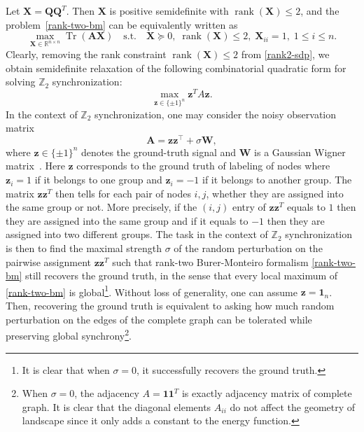 \documentclass[11pt,reqno]{amsart}
\theoremstyle{definition}
\begin{document}
\noindent
Let $\boldsymbol{X} = \mathbf Q\mathbf Q^T$. Then $\boldsymbol{X}$ is positive semidefinite with 
$\operatorname{rank}(\boldsymbol{X}) \le 2$, and the problem~\eqref{rank-two-bm} 
can be equivalently written as
\begin{equation}\label{rank2-sdp}
\max_{\boldsymbol{X}\in \mathbb{R}^{n\times n}} 
\operatorname{Tr}(\mathbf A\boldsymbol{X})
\quad \text{s.t.} \quad \boldsymbol{X} \succeq 0,\;
\operatorname{rank}(\boldsymbol{X}) \le 2,\;
\mathbf X_{ii} = 1,\; 1 \le i \le n.
\end{equation}
Clearly, removing the rank constraint $\operatorname{rank}(\boldsymbol{X}) \le 2$ from \eqref{rank2-sdp}, we obtain semidefinite relaxation of the following combinatorial quadratic form for solving $\mathbb Z_2$ synchronization:
\begin{equation}
    \max_{\boldsymbol{z}\in\{\pm 1\}^n}\boldsymbol{z}^TA\boldsymbol{z}.
\end{equation}
In the context of $\mathbb Z_2$ synchronization, one may consider the noisy observation matrix
\begin{equation}\label{gaussian-matrix}
    \boldsymbol A = \boldsymbol z \boldsymbol z^\top + \sigma \boldsymbol W,
\end{equation}
where $\boldsymbol z\in\{\pm1\}^n$ denotes the ground-truth signal and $\boldsymbol W$ is a Gaussian Wigner matrix~\cite{bandeira2016low}.
Here $\boldsymbol{z}$ corresponds to the ground truth of labeling of nodes where $\mathbf z_i=1$ if it belongs to one group and $\mathbf z_i=-1$ if it belongs to another group. The matrix $\boldsymbol{z}\boldsymbol{z}^T$ then tells for each pair of nodes $i,j$, whether they are assigned into the same group or not. More precisely, if the $(i,j)$ entry of $\boldsymbol{z}\boldsymbol{z}^T$ equals to $1$ then they are assigned into the same group and if it equals to $-1$ then they are assigned into two different groups. The task in the context of $\mathbb Z_2$ synchronization is then to find the maximal strength $\sigma$ of the random perturbation on the pairwise assignment $\boldsymbol{z}\boldsymbol{z}^T$ such that rank-two Burer-Monteiro formalism \eqref{rank-two-bm} still recovers the ground truth, in the sense that every local maximum of \eqref{rank-two-bm} is global\footnote{It is clear that when $\sigma=0$, it successfully recovers the ground truth.}.
Without loss of generality, one can assume $\boldsymbol{z}=\boldsymbol{1}_n$. Then, recovering the ground truth is equivalent to asking how much random perturbation on the edges of the complete graph can be tolerated while preserving global synchrony\footnote{When $\sigma=0$, the adjacency $A=\boldsymbol{1}\boldsymbol{1}^T$ is exactly adjacency matrix of complete graph. It is clear that the diagonal elements $A_{ii}$ do not affect the geometry of landscape since it only adds a constant to the energy function.}.
\end{document}

